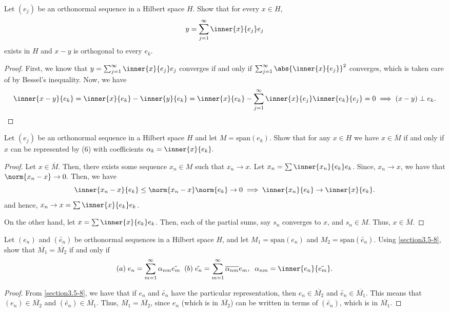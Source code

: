 \begin{question}
    Let $(e_j)$ be an orthonormal sequence in a Hilbert space $H$. Show that for every $x \in H$,
    \[ y = \sum_{j=1}^\infty \inner{x}{e_j} e_j \]
    exists in $H$ and $x-y$ is orthogonal to every $e_k$.
    \label{section3.5-7}
\end{question}
\begin{proof}
    First, we know that $y = \sum_{j=1}^\infty \inner{x}{e_j} e_j$ converges if and only if $\sum_{j=1}^\infty \abs{\inner{x}{e_j}}^2$ converges, which is taken care of by Bessel's inequality. Now, we have
    \[\inner{x-y}{e_k} = \inner{x}{e_k} - \inner{y}{e_k} = \inner{x}{e_k} - \sum_{j=1}^\infty \inner{x}{e_j} \inner{e_k}{e_j} = 0 \implies (x-y) \perp e_k.\]
\end{proof}


\begin{question}
    Let $(e_j)$ be an orthonormal sequence in a Hilbert space $H$ and let $M = \textrm{span}(e_k)$. Show that for any $x \in H$ we have $x \in \overline{M}$ if and only if $x$ can be represented by (6) with coefficients $\alpha_k = \inner{x}{e_k}.$
    \label{section3.5-8}
\end{question}
\begin{proof}
    Let $x \in \overline{M}$. Then, there exists some sequence $x_n \in M$ such that $x_n \rightarrow x$. Let $x_n = \sum \inner{x_n}{e_k} e_k$. Since, $x_n \rightarrow x$, we have that $\norm{x_n - x} \rightarrow 0.$ Then, we have
    \[\inner{x_n -x}{e_k} \leq \norm{x_n - x} \norm{e_k} \rightarrow 0 \implies \inner{x_n}{e_k} \rightarrow \inner{x}{e_k}.\]
    and hence, $x_n \rightarrow x = \sum \inner{x}{e_k} e_k$.

    On the other hand, let $x = \sum \inner{x}{e_k} e_k$. Then, each of the partial sums, say $s_n$ converges to $x$, and $s_n \in M$. Thus, $x \in \overline{M}$.
\end{proof}

\begin{question}
    Let $(e_n)$ and $(\tilde{e_n})$ be orthonormal sequences in a Hilbert space $H$, and let $M_1 = \textrm{span}(e_n)$ and $M_2 = \textrm{span}(\tilde{e_n})$. Using \ref{section3.5-8}, show that $\overline{M_1} = \overline{M_2}$ if and only if
    \[(a) \; e_n = \sum_{m=1}^\infty \alpha_{nm} \tilde{e_m} \;\; (b) \; \tilde{e_n} = \sum_{m=1}^\infty \overline{\alpha_{nm}} e_m , \;\; \alpha_{nm} = \inner{e_n}{\tilde{e_m}}.\]
    \label{section3.5-9}
\end{question}
\begin{proof}
    From \ref{section3.5-8}, we have that if $e_n$ and $\tilde{e_n}$ have the particular representation, then $e_n \in \overline{M_2}$ and $\tilde{e_n} \in \overline{M_1}$. This means that $(e_n) \in \overline{M_2}$ and $(\tilde{e_n}) \in \overline{M_1}$. Thus, $\overline{M_1} = \overline{M_2}$, since $e_n$ (which is in $\overline{M_2}$) can be written in terms of $(\tilde{e_n})$, which is in $\overline{M_1}$.
\end{proof}

